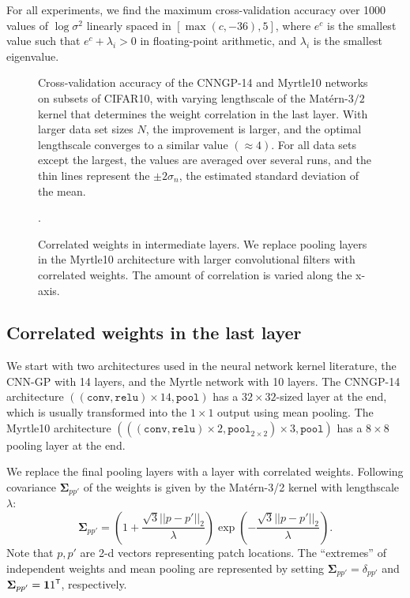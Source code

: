 \documentclass{article}
\theoremstyle{definition}
\newcommand{\vSigma}{\boldsymbol{\Sigma}}
\newcommand{\tp}{{\mathrm{\textsf{\tiny T}}}}
\newcommand{\bracket}[3]{{\left#1 #3 \right#2}}
\newcommand{\bra}{\bracket{(}{)}}
\begin{document}
For all experiments, we find the maximum cross-validation accuracy over 1000 values of $\log \sigma^2$ linearly spaced in $[\max(c, -36), 5]$, where $e^c$ is the smallest value such that $e^c + \lambda_i > 0$ in floating-point arithmetic, and $\lambda_i$ is the smallest eigenvalue.

\begin{figure}[htpb]
 \scalebox{1.0}{}
  \caption{Cross-validation accuracy of the CNNGP-14 and Myrtle10 networks on subsets of CIFAR10, with varying lengthscale of the Matérn-$3/2$ kernel that determines the weight correlation in the last layer. With larger data set sizes $N$, the improvement is larger, and the optimal lengthscale converges to a similar value $(\approx 4)$. For all data sets except the largest, the values are averaged over several runs, and the thin lines represent the $\pm 2\sigma_n$, the estimated standard deviation of the mean. \label{ref:fig-last-layer}}
\end{figure}

\begin{figure}[htpb]
  \scalebox{1.0}{}.
  \caption{Correlated weights in intermediate layers. We replace pooling layers in the Myrtle10 architecture with larger convolutional filters with correlated weights. The amount of correlation is varied along the x-axis. \label{ref:fig-all-layers}}
\end{figure}


\subsection{Correlated weights in the last layer}

We start with two architectures used in the neural network kernel literature, the CNN-GP \citep{novak2019infiniteconv,arora2019exact} with 14 layers, and the Myrtle network \citep{shankar2020without} with 10 layers. The CNNGP-14 architecture $((\texttt{conv}, \texttt{relu})\times 14, \texttt{pool})$ has a $32 \times 32$-sized layer at the end, which is usually transformed into the $1 \times 1$ output using mean pooling. The Myrtle10 architecture $(((\texttt{conv},\texttt{relu})\times 2, \texttt{pool}_{2\times 2}) \times 3, \texttt{pool})$ has a $8\times 8$ pooling layer at the end.

We replace the final pooling layers with a layer with correlated weights. Following \citep{dutordoir2020} covariance $\vSigma_{pp'}$ of the weights is given by the Matérn-3/2 kernel \citep{gpml} with lengthscale $\lambda$:
\begin{equation}
    \vSigma_{pp'} = \bra{1 + \frac{\sqrt{3}||p - p'||_2}{\lambda}} \exp\bra{-\frac{\sqrt{3}||p - p'||_2}{\lambda}}.
\end{equation}
Note that $p,p'$ are 2-d vectors representing patch locations. The ``extremes'' of independent weights and mean pooling are represented by setting $\vSigma_{pp'} = \delta_{pp'}$ and $\vSigma_{pp'} = {\boldsymbol 11}^\tp$, respectively.
\end{document}
